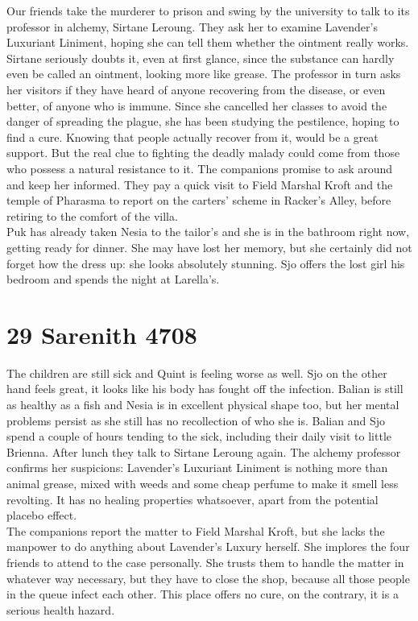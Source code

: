Our friends take the murderer to prison and swing by the university to talk to its professor in alchemy, Sirtane Leroung. They ask her to examine Lavender's Luxuriant Liniment, hoping she can tell them whether the ointment really works. Sirtane seriously doubts it, even at first glance, since the substance can hardly even be called an ointment, looking more like grease. The professor in turn asks her visitors if they have heard of anyone recovering from the disease, or even better, of anyone who is immune. Since she cancelled her classes to avoid the danger of spreading the plague, she has been studying the pestilence, hoping to find a cure. Knowing that people actually recover from it, would be a great support. But the real clue to fighting the deadly malady could come from those who possess a natural resistance to it. The companions promise to ask around and keep her informed. They pay a quick visit to Field Marshal Kroft and the temple of Pharasma to report on the carters' scheme in Racker's Alley, before retiring to the comfort of the villa.\\

Puk has already taken Nesia to the tailor's and she is in the bathroom right now, getting ready for dinner. She may have lost her memory, but she certainly did not forget how the dress up: she looks absolutely stunning. Sjo offers the lost girl his bedroom and spends the night at Larella's.\\

\section{29 Sarenith 4708}

The children are still sick and Quint is feeling worse as well. Sjo on the other hand feels great, it looks like his body has fought off the infection. Balian is still as healthy as a fish and Nesia is in excellent physical shape too, but her mental problems persist as she still has no recollection of who she is. Balian and Sjo spend a couple of hours tending to the sick, including their daily visit to little Brienna. After lunch they talk to Sirtane Leroung again. The alchemy professor confirms her suspicions: Lavender's Luxuriant Liniment is nothing more than animal grease, mixed with weeds and some cheap perfume to make it smell less revolting. It has no healing properties whatsoever, apart from the potential placebo effect.\\

The companions report the matter to Field Marshal Kroft, but she lacks the manpower to do anything about Lavender's Luxury herself. She implores the four friends to attend to the case personally. She trusts them to handle the matter in whatever way necessary, but they have to close the shop, because all those people in the queue infect each other. This place offers no cure, on the contrary, it is a serious health hazard.\\

